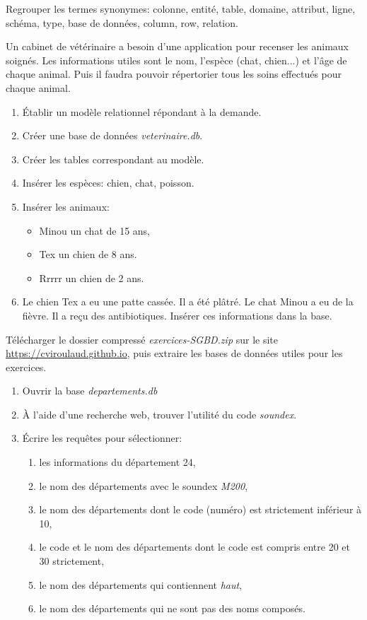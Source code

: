 \documentclass[a4paper,11pt]{article}
\begin{document}
\begin{exo}
Regrouper les termes synonymes: colonne, entité, table, domaine, attribut, ligne, schéma, type, base de données, column, row, relation.
\end{exo}
\begin{exo}
Un cabinet de vétérinaire a besoin d'une application pour recenser les animaux soignés. Les informations utiles sont le nom, l'espèce (chat, chien...) et l'âge de chaque animal. Puis il faudra pouvoir répertorier tous les soins effectués pour chaque animal.
\begin{enumerate}
\item Établir un modèle relationnel répondant à la demande.
\item Créer une base de données \emph{veterinaire.db}.
\item Créer les tables correspondant au modèle.
\item Insérer les espèces: chien, chat, poisson.
\item Insérer les animaux:
\begin{itemize}
    \item Minou un chat de 15 ans,
    \item Tex un chien de 8 ans.
    \item Rrrrr un chien de 2 ans.
\end{itemize}
\item Le chien Tex a eu une patte cassée. Il a été plâtré. Le chat Minou a eu de la fièvre. Il a reçu des antibiotiques. Insérer ces informations dans la base.
\end{enumerate}
\end{exo}
\begin{framed}\noindent Télécharger le dossier compressé \emph{exercices-SGBD.zip} sur le site \url{https://cviroulaud.github.io}, puis extraire les bases de données utiles pour les exercices.
\end{framed}
\begin{exo}
\begin{enumerate}
\item Ouvrir la base \emph{departements.db}
\item À l'aide d'une recherche web, trouver l'utilité du code \emph{soundex}.
\item Écrire les requêtes pour sélectionner:
\begin{enumerate}
\item les informations du département 24,
\item le nom des départements avec le soundex \emph{M200},
\item le nom des départements dont le code (numéro) est strictement inférieur à 10,
\item le code et le nom des départements dont le code est compris entre 20 et 30 strictement,
\item le nom des départements qui contiennent \emph{haut},
\item le nom des départements qui ne sont pas des noms composés.
\end{enumerate} 
\end{enumerate}
\end{exo}
\end{document}
